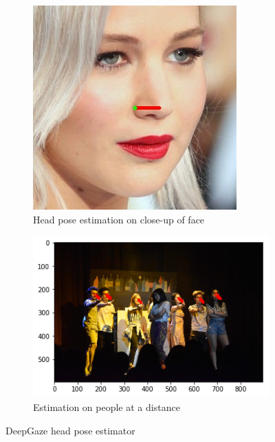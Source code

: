\begin{figure}[ht]
	\begin{subfigure}[b]{.5\textwidth}
		\centering
		\includegraphics[width=0.675\linewidth]{img/chapter4_analysis/headPose.jpeg}
		\caption{Head pose estimation on close-up of face}
	\end{subfigure}%
	\hspace{\fill} 
	\begin{subfigure}[b]{.5\textwidth}
		\centering
		\includegraphics[width=1.0\linewidth]{img/chapter4_analysis/deepgazeWhole.png}
		\caption{Estimation on people at a distance}
	\end{subfigure}
	\vspace{-2\baselineskip}
	\begin{center}
		\caption{DeepGaze head pose estimator}
		\label{fig:deepGaze}
	\end{center}
	\vspace{-2\baselineskip}
\end{figure}

